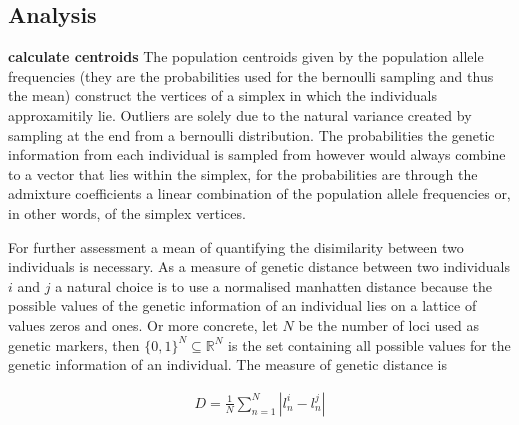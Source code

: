 \documentclass[a4paper, 11pt]{article}
\begin{document}
\subsection{Analysis}
\textbf{calculate centroids}
The population centroids given by the population allele frequencies (they are the probabilities used for the bernoulli sampling and thus the mean) construct the vertices of a simplex in which the individuals approxamitily lie. Outliers are solely due to the natural variance created by sampling at the end from a bernoulli distribution. The probabilities the genetic information from each individual is sampled from however would always combine to a vector that lies within the simplex, for the probabilities are through the admixture coefficients a linear combination of the population allele frequencies or, in other words, of the simplex vertices. 

For further assessment a mean of quantifying the disimilarity between two individuals is necessary. As a measure of genetic distance between two individuals $i$ and $j$ a natural choice is to use a normalised manhatten distance because the possible values of the genetic information of an individual lies on a lattice of values zeros and ones. Or more concrete, let $N$ be the number of loci used as genetic markers, then $\{0,1\}^N \subseteq \mathbb{R}^N$  is the set containing all possible values for the genetic information of an individual. The measure of genetic distance is 

\begin{align*}
D = \frac{1}{N}\sum^{N}_{n = 1} |l^i_n - l^j_n|
\end{align*}
\end{document}
